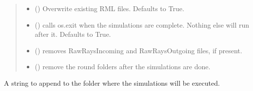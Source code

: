 \documentclass[letterpaper,10pt,english]{sphinxmanual}
\begin{document}
\begin{fulllineitems}
\begin{fulllineitems}
\begin{quote}
\begin{description}
\begin{itemize}
\item {} 
\sphinxAtStartPar
{} (\sphinxstyleliteralemphasis{\sphinxupquote{, }}) \textendash{} Overwrite existing RML files. Defaults to True.

\item {} 
\sphinxAtStartPar
{} (\sphinxstyleliteralemphasis{\sphinxupquote{, }}) \textendash{} calls os.exit when the simulations are complete.
Nothing else will run after it. Defaults to True.

\item {} 
\sphinxAtStartPar
{} (\sphinxstyleliteralemphasis{\sphinxupquote{, }}) \textendash{} removes RawRaysIncoming and RawRaysOutgoing files,
if present.

\item {} 
\sphinxAtStartPar
{} (\sphinxstyleliteralemphasis{\sphinxupquote{, }}) \textendash{} remove the round folders after the simulations
are done.

\end{itemize}

\end{description}\end{quote}

\end{fulllineitems}


\begin{fulllineitems}
\label{\detokenize{API:raypyng.simulate.Simulate.simulation_name}}
\pysigstartsignatures
\pysigline
{}
\pysigstopsignatures
\sphinxAtStartPar
A string to append to the folder where the simulations will be executed.

\end{fulllineitems}


\end{fulllineitems}
\end{document}
